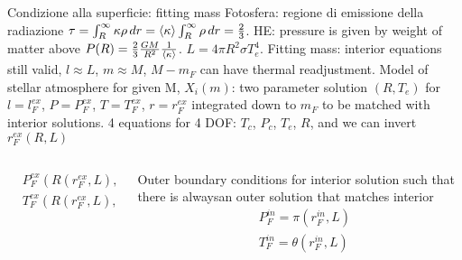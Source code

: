 \begin{frame}{Condizione alla superficie: fitting mass}
Fotosfera: regione di emissione della radiazione $\tau=\int_R^{\infty}\kappa\rho\,dr=\langle \kappa \rangle\int_R^{\infty}\rho\,dr=\frac{2}{3}$. HE: pressure is given by weight of matter above $P(R)=\frac{2}{3}\frac{GM}{R^2}\frac{1}{\langle \kappa \rangle}$. $L=4\pi R^2\sigma T_e^4$.
Fitting mass: interior equations still valid, $l\approx L$, $m\approx M$, $M-m_F$ can have thermal readjustment.
Model of stellar atmosphere for given M, $X_i(m)$: two parameter solution $(R,T_e)$ for $l=l_F^{ex}$, $P=P_F^{ex}$, $T=T_F^{ex}$, $r=r_F^{ex}$ integrated down to $m_F$ to be matched with interior solutions.
4 equations for 4 DOF: $T_c$, $P_c$, $T_e$, $R$, and we can invert $r_F^{ex}(R,L)$
\begin{columns}[T]
\begin{column}{0.5\textwidth}
\begin{align*}
&P_F^{ex}(R(r_F^{ex},L),L)=\pi(r_F^{ex},L)\\
&T_F^{ex}(R(r_F^{ex},L),L)=\theta(r_F^{ex},L)
\end{align*}
\end{column}
\begin{column}{0.445\textwidth}
	Outer boundary conditions for interior solution such that there is alwaysan outer solution that matches interior
\begin{align*}
&P_F^{in}=\pi(r_F^{in},L)\\
&T_F^{in}=\theta(r_F^{in},L)
\end{align*}
\end{column}
\end{columns}

\end{frame}

